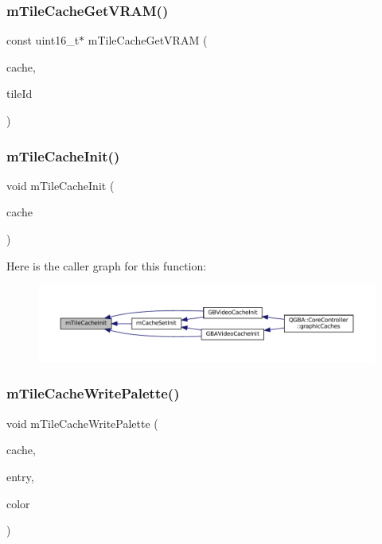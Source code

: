 \subsubsection{\texorpdfstring{m\+Tile\+Cache\+Get\+V\+R\+A\+M()}{mTileCacheGetVRAM()}}
{\footnotesize\ttfamily const uint16\+\_\+t$\ast$ m\+Tile\+Cache\+Get\+V\+R\+AM (\begin{DoxyParamCaption}\item[{struct m\+Tile\+Cache $\ast$}]{cache,  }\item[{unsigned}]{tile\+Id }\end{DoxyParamCaption})}

\mbox{\label{tile-cache_8c_ae11c387e6cfd9f19218653824ee13308}} 
\subsubsection{\texorpdfstring{m\+Tile\+Cache\+Init()}{mTileCacheInit()}}
{\footnotesize\ttfamily void m\+Tile\+Cache\+Init (\begin{DoxyParamCaption}\item[{struct m\+Tile\+Cache $\ast$}]{cache }\end{DoxyParamCaption})}

Here is the caller graph for this function\+:
\nopagebreak
\begin{figure}[H]
\begin{center}
\leavevmode
\includegraphics[width=350pt]{tile-cache_8c_ae11c387e6cfd9f19218653824ee13308_icgraph}
\end{center}
\end{figure}
\mbox{\label{tile-cache_8c_a49ed123bd2aa01fafd4affa947ed5a62}} 
\subsubsection{\texorpdfstring{m\+Tile\+Cache\+Write\+Palette()}{mTileCacheWritePalette()}}
{\footnotesize\ttfamily void m\+Tile\+Cache\+Write\+Palette (\begin{DoxyParamCaption}\item[{struct m\+Tile\+Cache $\ast$}]{cache,  }\item[{uint32\+\_\+t}]{entry,  }\item[{color\+\_\+t}]{color }\end{DoxyParamCaption})}

